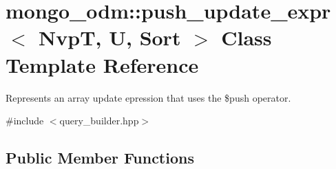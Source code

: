 \hypertarget{classmongo__odm_1_1push__update__expr}{}\section{mongo\+\_\+odm\+:\+:push\+\_\+update\+\_\+expr$<$ NvpT, U, Sort $>$ Class Template Reference}
\label{classmongo__odm_1_1push__update__expr}


Represents an array update epression that uses the \$push operator.  




{\ttfamily \#include $<$query\+\_\+builder.\+hpp$>$}

\subsection*{Public Member Functions}
